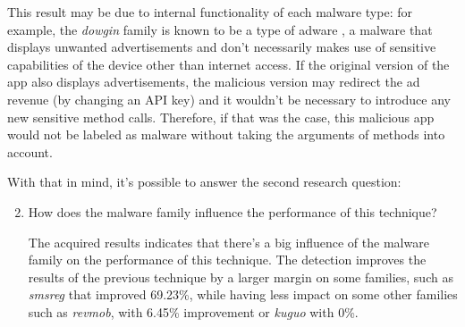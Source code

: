 This result may be due to internal functionality of each malware type: for example, the \textit{dowgin} family is known to be a type of adware \cite{noauthor_androiddowgin_nodate}, a malware that displays unwanted advertisements \cite{noauthor_what_nodate} and don't necessarily makes use of sensitive capabilities of the device other than internet access. If the original version of the app also displays advertisements, the malicious version may redirect the ad revenue (by changing an API key) and it wouldn't be necessary to introduce any new sensitive method calls. Therefore, if that was the case, this malicious app would not be labeled as malware without taking the arguments of methods into account.

With that in mind, it's possible to answer the second research question:

\begin{enumerate}
    \setcounter{enumi}{1}
    \item How does the malware family influence the performance of this technique?

    The acquired results indicates that there's a big influence of the malware family on the performance of this technique. The detection improves the results of the previous technique by a larger margin on some families, such as \textit{smsreg} that improved 69.23\%, while having less impact on some other families such as \textit{revmob}, with 6.45\% improvement or \textit{kuguo} with 0\%.
\end{enumerate}


